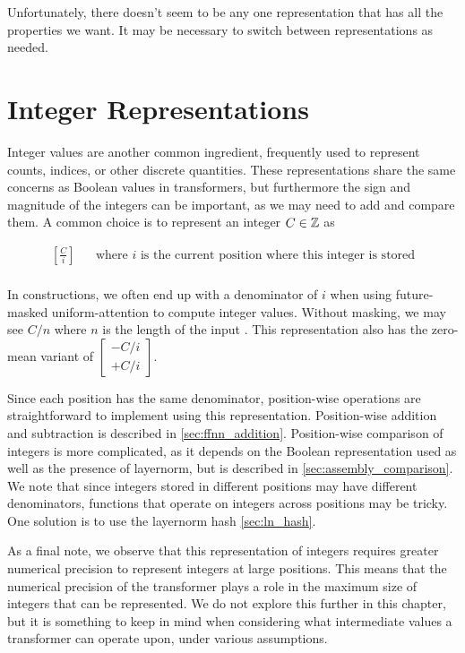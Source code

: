 Unfortunately, there doesn't seem to be any one representation that has all the properties we want. It may be necessary to switch between representations as needed.

\section{Integer Representations}
\label{sec:integers}


Integer values are another common ingredient, frequently used to represent counts, indices, or other discrete quantities.
These representations share the same concerns as Boolean values in transformers, but furthermore the sign and magnitude of the integers can be important, as we may need to add and compare them. A common choice is to represent an integer $C\in \mathbb{Z}$ as

  \begin{align*}
    \left[\frac{C}{i}\right] & & \text{where $i$ is the current position where this integer is stored}\\
  \end{align*}

In constructions, we often end up with a denominator of $i$ when using future-masked uniform-attention to compute integer values.
Without masking, we may see $C/n$ where $n$ is the length of the input \cite{chiang+:icml2023}.
This representation also has the zero-mean variant of $\begin{bmatrix}
  -C/i \\ +C/i
\end{bmatrix}$.

Since each position has the same denominator, position-wise operations are straightforward to implement using this representation. Position-wise addition and subtraction is described in \cref{sec:ffnn_addition}. Position-wise comparison of integers is more complicated, as it depends on the Boolean representation used as well as the presence of layernorm, but is described in \cref{sec:assembly_comparison}. We note that since integers stored in different positions may have different denominators, functions that operate on integers across positions may be tricky. One solution is to use the layernorm hash \cref{sec:ln_hash}.

As a final note, we observe that this representation of integers requires greater numerical precision to represent integers at large positions.
This means that the numerical precision of the transformer plays a role in the maximum size of integers that can be represented.
We do not explore this further in this chapter, but it is something to keep in mind when considering what intermediate values a transformer can operate upon, under various assumptions.

